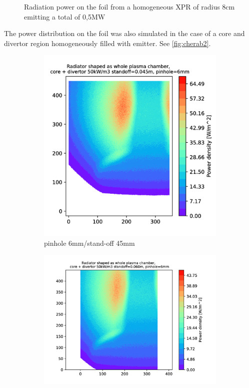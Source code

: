 \begin{figure}
    \caption{Radiation power on the foil from a homogeneous XPR of radius 8cm emitting a total of 0,5MW}
    \label{fig:cherab1}
\end{figure}

The power distribution on the foil was also simulated in the case of a core and divertor region homogeneously filled with emitter. See \autoref{fig:cherab2}.


\begin{figure}
     \centering
     \begin{subfigure}{0.4\textwidth}
         \centering
         \includegraphics[trim={70 0 0 0},clip,width=\textwidth]{Chapters/appendix1/figs/6_45_all.png}
         \caption{pinhole 6mm/stand-off 45mm}
         \label{fig:6_45_all}
     \end{subfigure}
     \hfill
     \begin{subfigure}{0.50\textwidth}
         \centering
         \includegraphics[trim={130 0 150 0},clip,width=\textwidth]{Chapters/appendix1/figs/6_60_all.png}

\end{subfigure}
\end{figure}
